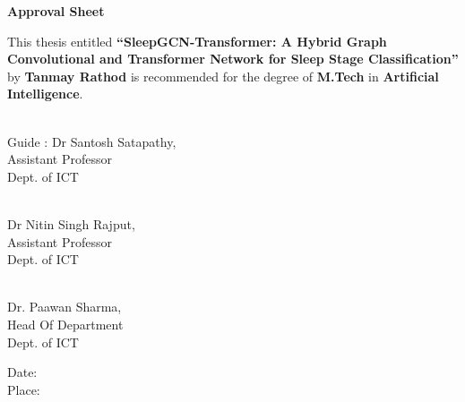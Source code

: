 \begin{center}
    \textbf{\large Approval Sheet}
\end{center}
	
This thesis entitled \textbf{\enquote{SleepGCN-Transformer: A Hybrid Graph
Convolutional and Transformer Network for Sleep
Stage Classification}} by \textbf{Tanmay Rathod} is recommended for the degree of \textbf{M.Tech} in \textbf{Artificial Intelligence}.
\vspace{0.8cm}



\hspace{9cm}  
\begin{flushright}   
    \makebox[1.8in]{\hrulefill}\\
    Guide : Dr Santosh Satapathy, \\
    Assistant Professor \\
    Dept. of ICT \\
  
\end{flushright}
\vspace{0.5cm}


\hspace{9cm}  
\begin{flushright}   
    \makebox[1.8in]{\hrulefill}\\
    Dr Nitin Singh Rajput, \\
    Assistant Professor \\
    Dept. of ICT
\end{flushright}
\vspace{0.5cm}



\begin{flushright}
    \makebox[1.8in]{\hrulefill}\\
    Dr. Paawan Sharma,\\
    Head Of Department \\ 
    Dept. of ICT
\end{flushright}

\vfill
\begin{flushleft}
    Date: \makebox[1.8in]{\hrulefill}\\
    Place: \makebox[1.8in]{\hrulefill}\\    
\end{flushleft}

